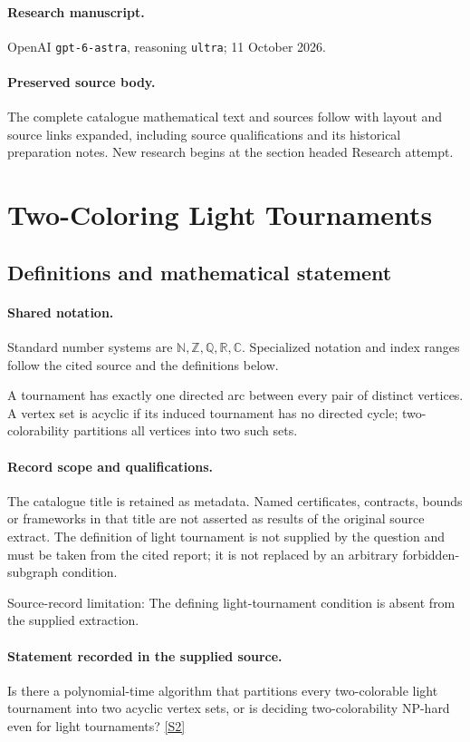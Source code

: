 \documentclass[11pt]{article}
\begin{document}
\paragraph{Research manuscript.} OpenAI \texttt{gpt-6-astra}, reasoning \texttt{ultra}; 11 October 2026.
\paragraph{Preserved source body.} The complete catalogue mathematical text and sources follow with layout and source links expanded, including source qualifications and its historical preparation notes. New research begins at the section headed Research attempt.

\section{Two-Coloring Light Tournaments}\label{statement}

\subsection{Definitions and mathematical statement}

\paragraph{Shared notation.}Standard number systems are $\mathbb N,\mathbb Z,\mathbb Q,\mathbb R,\mathbb C$. Specialized notation and index ranges follow the cited source and the definitions below.


A tournament has exactly one directed arc between every pair of distinct vertices. A vertex set is acyclic if its induced tournament has no directed cycle; two-colorability partitions all vertices into two such sets.
\paragraph{Record scope and qualifications.}
The catalogue title is retained as metadata. Named certificates, contracts, bounds or frameworks in that title are not asserted as results of the original source extract.
The definition of light tournament is not supplied by the question and must be taken from the cited report; it is not replaced by an arbitrary forbidden-subgraph condition.

Source-record limitation: The defining light-tournament condition is absent from the supplied extraction.
\paragraph{Statement recorded in the supplied source.}
Is there a polynomial-time algorithm that partitions every two-colorable light tournament into two acyclic vertex sets, or is deciding two-colorability NP-hard even for light tournaments? \href{https://doi.org/10.4171/owr/2024/50}{[S2]}
\end{document}
